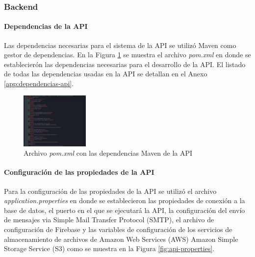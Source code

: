 \subsubsection{Backend}

\paragraph{Dependencias de la API}

Las dependencias necesarias para el sistema de la API se utilizó Maven como gestor de dependencias.
En la Figura \ref{fig:api-dependencies} se muestra el archivo \textit{pom.xml} en donde se establecierón las dependencias necesarias para el desarrollo de la API.
El listado de todas las dependencias usadas en la API se detallan en el Anexo \ref{app:dependencias-api}.

\begin{figure}[H]
    \centering
    \includegraphics[width=0.3\textwidth]{resources/images/maven}
    \caption{Archivo \textit{pom.xml} con las dependencias Maven de la API}
    \label{fig:api-dependencies}
\end{figure}

\paragraph{Configuración de las propiedades de la API}
Para la configuración de las propiedades de la API se utilizó el archivo \textit{application.properties} en donde se establecieron las propiedades de conexión a la base de datos, el puerto en el que se ejecutará la API, la configuración del envío de mensajes via Simple Mail Transfer Protocol (SMTP), el archivo de configuración de Firebase y las variables de configuración de los servicios de almacenamiento de archivos de Amazon Web Services (AWS) Amazon Simple Storage Service (S3) como se muestra en la Figura \ref{fig:api-properties}.


